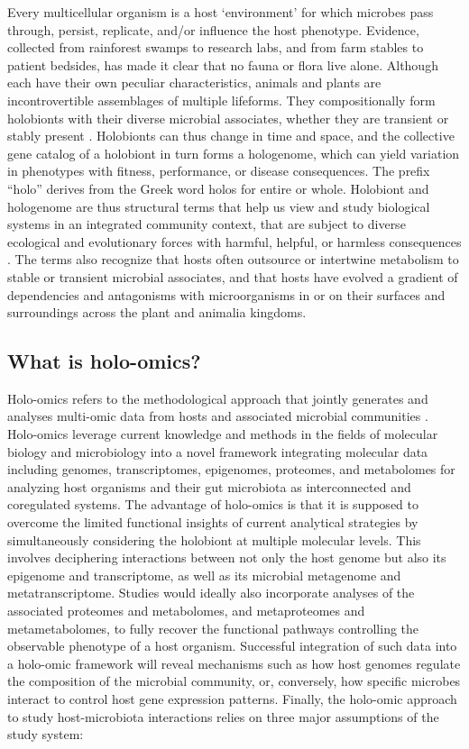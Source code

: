 \documentclass[
]{book}
\begin{document}
Every multicellular organism is a host `environment' for which microbes pass through, persist, replicate, and/or influence the host phenotype. Evidence, collected from rainforest swamps to research labs, and from farm stables to patient bedsides, has made it clear that no fauna or flora live alone. Although each have their own peculiar characteristics, animals and plants are incontrovertible assemblages of multiple lifeforms. They compositionally form holobionts with their diverse microbial associates, whether they are transient or stably present \citep{Theis2016-dc}. Holobionts can thus change in time and space, and the collective gene catalog of a holobiont in turn forms a hologenome, which can yield variation in phenotypes with fitness, performance, or disease consequences. The prefix ``holo'' derives from the Greek word holos for entire or whole. Holobiont and hologenome are thus structural terms that help us view and study biological systems in an integrated community context, that are subject to diverse ecological and evolutionary forces with harmful, helpful, or harmless consequences \citep{Rosenberg2013-dc}. The terms also recognize that hosts often outsource or intertwine metabolism to stable or transient microbial associates, and that hosts have evolved a gradient of dependencies and antagonisms with microorganisms in or on their surfaces and surroundings across the plant and animalia kingdoms.

\hypertarget{what-is-holo-omics}{%
\subsection*{What is holo-omics?}\label{what-is-holo-omics}}

Holo-omics refers to the methodological approach that jointly generates and analyses multi-omic data from hosts and associated microbial communities \citep{Nyholm2020-ua}. Holo-omics leverage current knowledge and methods in the fields of molecular biology and microbiology into a novel framework integrating molecular data including genomes, transcriptomes, epigenomes, proteomes, and metabolomes for analyzing host organisms and their gut microbiota as interconnected and coregulated systems. The advantage of holo-omics is that it is supposed to overcome the limited functional insights of current analytical strategies by simultaneously considering the holobiont at multiple molecular levels. This involves deciphering interactions between not only the host genome but also its epigenome and transcriptome, as well as its microbial metagenome and metatranscriptome. Studies would ideally also incorporate analyses of the associated proteomes and metabolomes, and metaproteomes and metametabolomes, to fully recover the functional pathways controlling the observable phenotype of a host organism. Successful integration of such data into a holo-omic framework will reveal mechanisms such as how host genomes regulate the composition of the microbial community, or, conversely, how specific microbes interact to control host gene expression patterns. Finally, the holo-omic approach to study host-microbiota interactions relies on three major assumptions of the study system:
\end{document}
